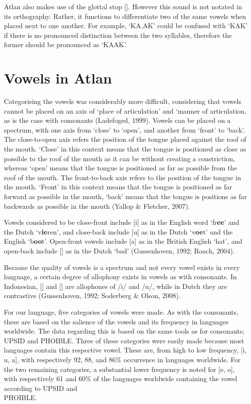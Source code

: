 Atlan also makes use of the glottal stop [\textglotstop]. However this sound is not notated in its orthography. Rather, it functions to differentiate two of the same vowels when placed next to one another. For example, ‘KA.AK’ could be confused with ‘KAK’ if there is no pronounced distinction between the two syllables, therefore the former should be pronounced as ‘KA\textglotstop AK’. 


\section{Vowels in Atlan}

Categorising the vowels was considerably more difficult, considering that vowels cannot be placed on an axis of ‘place of articulation’ and ‘manner of articulation, as is the case with consonants (Ladefoged, 1999). Vowels can be placed on a spectrum, with one axis from ‘close’ to ‘open’, and another from ‘front’ to ‘back’. The close-to-open axis refers the position of the tongue placed against the roof of the mouth. ‘Close’ in this context means that the tongue is positioned as close as possible to the roof of the mouth as it can be without creating a constriction, whereas ‘open’ means that the tongue is positioned as far as possible from the roof of the mouth. The front-to-back axis refers to the position of the tongue in the mouth. ‘Front’ in this context means that the tongue is positioned as far forward as possible in the mouth, ‘back’ means that the tongue is positions as far backwards as possible in the mouth (Yallop \& Fletcher, 2007). 

Vowels considered to be close-front include [i] as in the English word ‘fr{\bf ee}’ and the Dutch ‘v{\bf ie}ren’, and close-back include [u] as in the Dutch ‘v{\bf oe}t’ and the English ‘b{\bf oo}t’. Open-front vowels include [a] as in the British English ‘hat’, and open-back include [\textscripta] as in the Dutch ‘bad’ (Gussenhoven, 1992; Roach, 2004). 

Because the quality of vowels is a spectrum and not every vowel exists in every language, a certain degree of allophony exists in vowels as with consonants. In Indonesian, [\textsci] and [\textupsilon] are allophones of /i/ and /u/, while in Dutch they are contrastive (Gussenhoven, 1992; Soderberg \& Olson, 2008). 

For our language, five categories of vowels were made. As with the consonants, these are based on the salience of the vowels and its frequency in languages worldwide. The data regarding this is based on the same tools as for consonants; UPSID and PHOIBLE. Three of these categories were easily made because most languages contain this respective vowel. These are, from high to low frequency, [i, u, a], with respectively 92, 88, and 86\% occurrence in languages worldwide. For the two remaining categories, a substantial lower frequency is noted for [e, o], with respectively 61 and 60\% of the languages worldwide containing the vowel according to UPSID and \\ PHOIBLE. 

